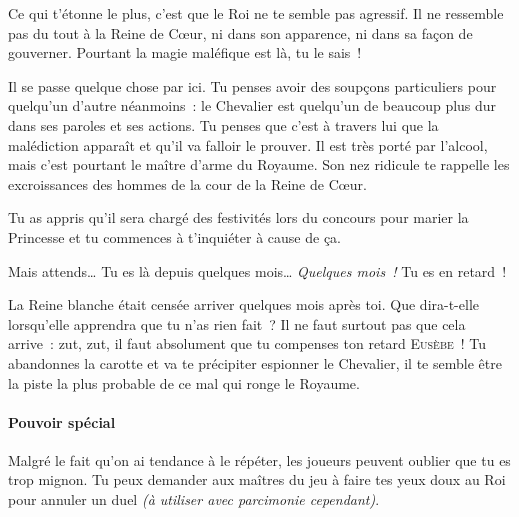 {{Ce qui t’étonne le plus, c’est que le Roi ne te semble pas agressif.
Il ne ressemble pas du tout à la Reine de Cœur, ni dans son apparence, ni dans sa façon de gouverner.
Pourtant la magie maléfique est là, tu le sais~!

Il se passe quelque chose par ici.
Tu penses avoir des soupçons particuliers pour quelqu’un d’autre néanmoins~:
le Chevalier est quelqu’un de beaucoup plus dur dans ses paroles et ses actions.
Tu penses que c’est à travers lui que la malédiction apparaît et qu’il va falloir le prouver.
Il est très porté par l’alcool, mais c’est pourtant le maître d’arme du Royaume.
Son nez ridicule te rappelle les excroissances des hommes de la cour de la Reine de Cœur.

Tu as appris qu’il sera chargé des festivités lors du concours pour marier la Princesse et tu commences à t’inquiéter à cause de ça.

Mais attends…  Tu es là depuis quelques mois…
\emph{Quelques mois~!}
Tu es en retard~!

La Reine blanche était censée arriver quelques mois après toi.
Que dira-t-elle lorsqu’elle apprendra que tu n’as rien fait~?
Il ne faut surtout pas que cela arrive~:  zut, zut, il faut absolument que tu compenses ton retard \textsc{Eusèbe}~!
Tu abandonnes la carotte et va te précipiter espionner le Chevalier, il te semble être la piste la plus probable de ce mal qui ronge le Royaume.
}

\paragraph{Pouvoir spécial}{
Malgré le fait qu’on ai tendance à le répéter, les joueurs peuvent oublier que tu es trop mignon.
Tu peux demander aux maîtres du jeu à faire tes yeux doux au Roi pour annuler un duel \textit{(à utiliser avec parcimonie cependant)}.
}

}

